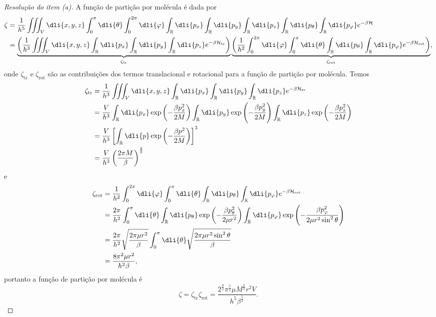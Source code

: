 \begin{proof}[Resolução do item (a)]
    A função de partição por molécula é dada por
    \begin{align*}
        \zeta &= \frac{1}{h^5}\iiint_V \dli{x,y,z} \int_0^{\pi}\dli{\theta}\int_0^{2\pi} \dli{\varphi} \int_{\mathbb{R}}\dli{p_x}\int_{\mathbb{R}} \dli{p_y} \int_{\mathbb{R}}\dli{p_z}\int_{\mathbb{R}}\dli{p_\theta} \int_{\mathbb{R}}\dli{p_{\varphi}} e^{-\beta \mathcal{H}}\\
              &= \underbrace{\left(\frac{1}{h^3}\iiint_V \dli{x,y,z}\int_{\mathbb{R}}\dli{p_x}\int_{\mathbb{R}} \dli{p_y} \int_{\mathbb{R}}\dli{p_z} e^{-\beta \mathcal{H}_{\mathrm{tr}}}\right)}_{\zeta_{\mathrm{tr}}}\underbrace{\left(\frac{1}{h^2}\int_0^{2\pi} \dli{\varphi} \int_0^\pi \dli{\theta} \int_{\mathbb{R}}\dli{p_\theta} \int_{\mathbb{R}}\dli{p_{\varphi}} e^{-\beta \mathcal{H}_{\mathrm{rot}}}\right)}_{\zeta_{\mathrm{rot}}},
    \end{align*}
    onde \(\zeta_{\mathrm{tr}}\) e \(\zeta_{\mathrm{rot}}\) são as contribuições dos termos translacional e rotacional para a função de partição por molécula. Temos
    \begin{align*}
        \zeta_{\mathrm{tr}} &= \frac{1}{h^3}\iiint_V \dli{x,y,z}\int_{\mathbb{R}}\dli{p_x}\int_{\mathbb{R}} \dli{p_y} \int_{\mathbb{R}}\dli{p_z} e^{-\beta \mathcal{H}_{\mathrm{tr}}}\\
                   &= \frac{V}{h^3} \int_{\mathbb{R}}\dli{p_x} \exp\left(-\frac{\beta p_x^2}{2M}\right) \int_{\mathbb{R}}\dli{p_y}\exp\left(-\frac{\beta p_y^2}{2M}\right)\int_{\mathbb{R}}\dli{p_z}\exp\left(-\frac{\beta p_z^2}{2M}\right)\\
                   &= \frac{V}{h^3} \left[\int_{\mathbb{R}}\dli{p} \exp\left(-\frac{\beta p^2}{2M}\right)\right]^3\\
                   &= \frac{V}{h^3}\left(\frac{2\pi M}{\beta}\right)^{\frac32}
    \end{align*}
    e
    \begin{align*}
        \zeta_{\mathrm{rot}} &= \frac{1}{h^2}\int_0^{2\pi} \dli{\varphi} \int_0^\pi \dli{\theta} \int_{\mathbb{R}}\dli{p_\theta} \int_{\mathbb{R}}\dli{p_{\varphi}} e^{-\beta \mathcal{H}_{\mathrm{rot}}}\\
                    &= \frac{2\pi}{h^2} \int_0^\pi \dli{\theta} \int_{\mathbb{R}} \dli{p_\theta} \exp\left(-\frac{\beta p_\theta^2}{2\mu r^2}\right) \int_{\mathbb{R}} \dli{p_{\varphi}} \exp\left(-\frac{\beta p_{\varphi}^2}{2\mu r^2 \sin^2\theta}\right)\\
                    &= \frac{2\pi}{h^2} \sqrt{\frac{2\pi\mu r^2}{\beta}} \int_0^\pi \dli{\theta} \sqrt{\frac{2\pi\mu r^2 \sin^2\theta}{\beta}}\\
                    &= \frac{8\pi^2 \mu r^2}{h^2 \beta},
    \end{align*}
    portanto a função de partição por molécula é
    \begin{equation*}
        \zeta = \zeta_{\mathrm{tr}}\zeta_{\mathrm{rot}} = \frac{2^{\frac92}\pi^{\frac72}\mu M^{\frac32} r^2V}{h^5 \beta^{\frac52}}.
    \end{equation*}


\end{proof}
